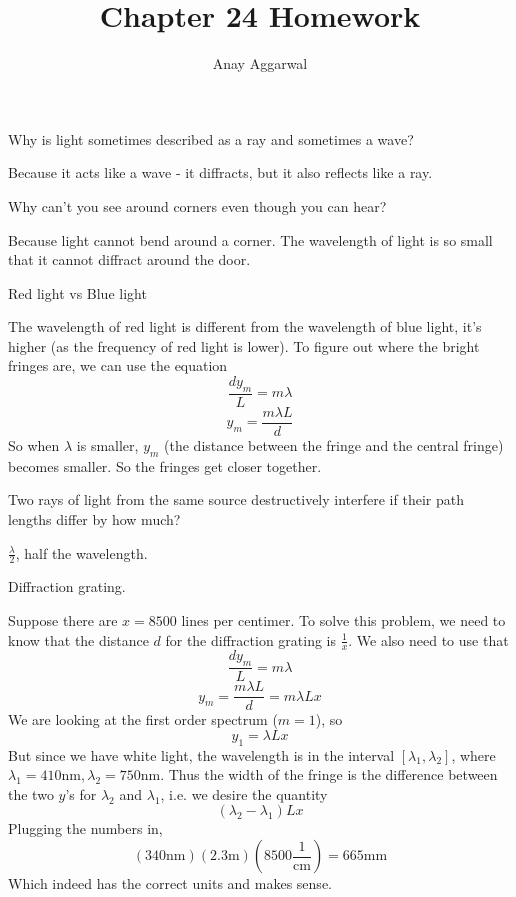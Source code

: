 \documentclass[11pt]{scrartcl}
\title{Chapter 24 Homework}
\author{Anay Aggarwal}
\begin{document}
\maketitle
\begin{example}
  [Question 3]
  Why is light sometimes described as a ray and sometimes a wave?
\end{example}
\begin{soln}
  Because it acts like a wave - it diffracts, but it also reflects like a ray.
\end{soln}
\begin{example}
  [Question 4]
  Why can't you see around corners even though you can hear?
\end{example}
\begin{soln}
  Because light cannot bend around a corner. The wavelength of light is so small that it cannot diffract around the door.
\end{soln}
\begin{example}
  [Question 6]
  Red light vs Blue light
\end{example}
\begin{soln}
  The wavelength of red light is different from the wavelength of blue light, it's higher (as the frequency of red light is lower). To figure out where the bright fringes
  are, we can use the equation
  $$\frac{dy_m}{L} = m\lambda$$
  $$y_m=\frac{m\lambda L}{d}$$
  So when $\lambda$ is smaller, $y_m$ (the distance between the fringe and the central fringe) becomes smaller. So the fringes get closer together.
\end{soln}
\begin{example}
  [Question 7]
  Two rays of light from the same source destructively interfere if their path lengths differ by how much?
\end{example}
\begin{soln}
  $\frac{\lambda}{2}$, half the wavelength.
\end{soln}
\begin{example}
  [Problem 36]
  Diffraction grating.
\end{example}
\begin{soln}
  Suppose there are $x=8500$ lines per centimer. To solve this problem, we need to know that the distance $d$ for the diffraction grating is $\frac{1}{x}$. We also need to use that
  $$\frac{dy_m}{L}=m\lambda$$
  $$y_m=\frac{m\lambda L}{d}=m\lambda L x$$
  We are looking at the first order spectrum ($m=1$), so
  $$y_1=\lambda L x$$
  But since we have white light, the wavelength is in the interval $[\lambda_1, \lambda_2]$, where $\lambda_1=410 \mathrm{nm}, \lambda_2=750 \mathrm{nm}$.
  Thus the width of the fringe is the difference between the two $y$'s for $\lambda_2$ and $\lambda_1$, i.e. we desire the quantity
  $$(\lambda_2-\lambda_1)Lx$$
  Plugging the numbers in,
  $$(340\mathrm{nm})(2.3 \mathrm{m})(8500 \frac{1}{\mathrm{cm}})=665\mathrm{mm}$$
  Which indeed has the correct units and makes sense.
\end{soln}
\end{document}
